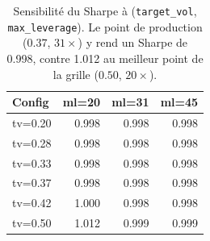 \begin{table}[H]
\centering
\caption{Sensibilité du Sharpe à (\texttt{target\_vol}, \texttt{max\_leverage}). Le point de production ($0.37$, $31\times$) y rend un Sharpe de 0.998, contre 1.012 au meilleur point de la grille ($0.50$, $20\times$).}
\label{tab:sensitivity}
\begin{tabular}{lrrr}
\toprule
Config & ml=20 & ml=31 & ml=45 \\
\midrule
tv=0.20 & 0.998 & 0.998 & 0.998 \\
tv=0.28 & 0.998 & 0.998 & 0.998 \\
tv=0.33 & 0.998 & 0.998 & 0.998 \\
tv=0.37 & 0.998 & 0.998 & 0.998 \\
tv=0.42 & 1.000 & 0.998 & 0.998 \\
tv=0.50 & 1.012 & 0.999 & 0.999 \\
\bottomrule
\end{tabular}
\end{table}
